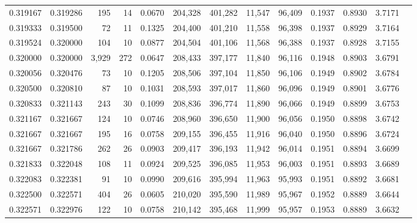 \begin{tabular}{rrrrrrrrrrrrr}
0.319167 & 0.319286 &   195 &  14 &                                     0.0670 & 204,328 & 401,282 &  11,547 &  96,409 & 0.1937 & 0.8930 & 3.7171 \\
0.319333 & 0.319500 &    72 &  11 &                                     0.1325 & 204,400 & 401,210 &  11,558 &  96,398 & 0.1937 & 0.8929 & 3.7164 \\
0.319524 & 0.320000 &   104 &  10 &                                     0.0877 & 204,504 & 401,106 &  11,568 &  96,388 & 0.1937 & 0.8928 & 3.7155 \\
0.320000 & 0.320000 & 3,929 & 272 &                                     0.0647 & 208,433 & 397,177 &  11,840 &  96,116 & 0.1948 & 0.8903 & 3.6791 \\
0.320056 & 0.320476 &    73 &  10 &                                     0.1205 & 208,506 & 397,104 &  11,850 &  96,106 & 0.1949 & 0.8902 & 3.6784 \\
0.320500 & 0.320810 &    87 &  10 &                                     0.1031 & 208,593 & 397,017 &  11,860 &  96,096 & 0.1949 & 0.8901 & 3.6776 \\
0.320833 & 0.321143 &   243 &  30 &                                     0.1099 & 208,836 & 396,774 &  11,890 &  96,066 & 0.1949 & 0.8899 & 3.6753 \\
0.321167 & 0.321667 &   124 &  10 &                                     0.0746 & 208,960 & 396,650 &  11,900 &  96,056 & 0.1950 & 0.8898 & 3.6742 \\
0.321667 & 0.321667 &   195 &  16 &                                     0.0758 & 209,155 & 396,455 &  11,916 &  96,040 & 0.1950 & 0.8896 & 3.6724 \\
0.321667 & 0.321786 &   262 &  26 &                                     0.0903 & 209,417 & 396,193 &  11,942 &  96,014 & 0.1951 & 0.8894 & 3.6699 \\
0.321833 & 0.322048 &   108 &  11 &                                     0.0924 & 209,525 & 396,085 &  11,953 &  96,003 & 0.1951 & 0.8893 & 3.6689 \\
0.322083 & 0.322381 &    91 &  10 &                                     0.0990 & 209,616 & 395,994 &  11,963 &  95,993 & 0.1951 & 0.8892 & 3.6681 \\
0.322500 & 0.322571 &   404 &  26 &                                     0.0605 & 210,020 & 395,590 &  11,989 &  95,967 & 0.1952 & 0.8889 & 3.6644 \\
0.322571 & 0.322976 &   122 &  10 &                                     0.0758 & 210,142 & 395,468 &  11,999 &  95,957 & 0.1953 & 0.8889 & 3.6632 \\

\end{tabular}
